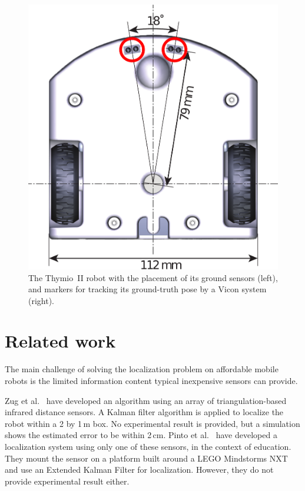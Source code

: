 \documentclass[letterpaper, 10pt, conference]{ieeeconf}
\begin{document}
\begin{figure}
\includegraphics[width=.43\columnwidth]{thymio2-dimensions}\hfill
{}
\vspace{-.07cm}
\caption{The Thymio~II robot with the placement of its ground sensors (left), and markers for tracking its ground-truth pose by a Vicon system (right).}
\label{fig:thymio}
\end{figure}

\section{Related work}

The main challenge of solving the localization problem on affordable mobile robots is the limited information content typical inexpensive sensors can provide.

Zug et al.~\cite{zug2011design} have developed an algorithm using an array of triangulation-based infrared distance sensors.
A Kalman filter algorithm is applied to localize the robot within a 2 by 1\,m box.
No experimental result is provided, but a simulation shows the estimated error to be within 2\,cm.
Pinto et al.~\cite{pinto2012localization} have developed a localization system using only one of these sensors, in the context of education.
They mount the sensor on a platform built around a LEGO Mindstorms NXT and use an Extended Kalman Filter for localization.
However, they do not provide experimental result either.
\end{document}
